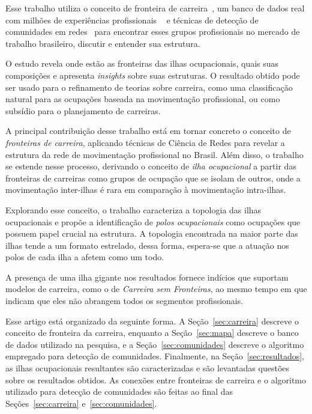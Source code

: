 \documentclass[
  article,
  11pt,
  a4paper,
  english,
  brazil,
  sumario=tradicional]{abntex2}
\begin{document}
Esse trabalho utiliza o conceito de fronteira de carreira~\cite{Gunz2007-hr}, um banco de dados real com milhões de experiências profissionais ~\cite{VAGAS_Tecnologia2015-yv} e técnicas de detecção de comunidades em redes~\cite{Rosvall2009-sd} para encontrar esses grupos profissionais no mercado de trabalho brasileiro, discutir e entender sua estrutura.

O estudo revela onde estão as fronteiras das ilhas ocupacionais, quais suas composições e apresenta \textit{insights} sobre suas estruturas. O resultado obtido pode ser usado para o refinamento de teorias sobre carreira, como uma classificação natural para as ocupações baseada na movimentação profissional, ou como subsídio para o planejamento de carreiras.

A principal contribuição desse trabalho está em tornar concreto o conceito de \textit{fronteiras de carreira}, aplicando técnicas de Ciência de Redes para revelar a estrutura da rede de movimentação profissional no Brasil. Além disso, o trabalho se estende nesse processo, derivando o conceito de \textit{ilha ocupacional} a partir das fronteiras de carreiras como grupos de ocupação que se isolam de outros, onde a movimentação inter-ilhas é rara em comparação à movimentação intra-ilhas.

Explorando esse conceito, o trabalho caracteriza a topologia das ilhas ocupacionais e propõe a identificação de \textit{polos ocupacionais} como ocupações que possuem papel crucial na estrutura. A topologia encontrada na maior parte das ilhas tende a um formato estrelado, dessa forma, espera-se que a atuação nos polos de cada ilha a afetem como um todo.

A presença de uma ilha gigante nos resultados fornece indícios que suportam modelos de carreira, como o de \textit{Carreira sem Fronteiras}, ao mesmo tempo em que indicam que eles não abrangem todos os segmentos profissionais.

Esse artigo está organizado da seguinte forma. A Seção~\ref{sec:carreira} descreve o conceito de fronteira da carreira, enquanto a Seção~\ref{sec:mapa} descreve o banco de dados utilizado na pesquisa, e a Seção~\ref{sec:comunidades} descreve o algoritmo empregado para detecção de comunidades. Finalmente, na Seção~\ref{sec:resultados}, as ilhas ocupacionais resultantes são caracterizadas e são levantadas questões sobre os resultados obtidos. As conexões entre fronteiras de carreira e o algoritmo utilizado para detecção de comunidades são feitas ao final das Seções~\ref{sec:carreira} e~\ref{sec:comunidades}.
\end{document}
